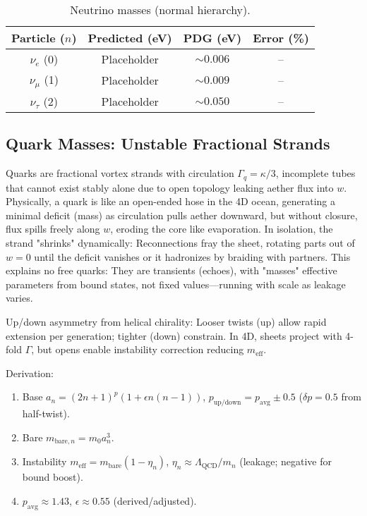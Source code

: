 \begin{table}[h!]
\centering
\begin{tabular}{|c|c|c|c|}
\hline
Particle ($n$) & Predicted (eV) & PDG (eV) & Error (\%) \\
\hline
$\nu_e$ (0) & Placeholder & $\sim 0.006$ & -- \\
$\nu_\mu$ (1) & Placeholder & $\sim 0.009$ & -- \\
$\nu_\tau$ (2) & Placeholder & $\sim 0.050$ & -- \\
\hline
\end{tabular}
\caption{Neutrino masses (normal hierarchy).}
\label{tab:neutrinos}
\end{table}

\subsection{Quark Masses: Unstable Fractional Strands}

Quarks are fractional vortex strands with circulation $\Gamma_q = \kappa / 3$, incomplete tubes that cannot exist stably alone due to open topology leaking aether flux into $w$. Physically, a quark is like an open-ended hose in the 4D ocean, generating a minimal deficit (mass) as circulation pulls aether downward, but without closure, flux spills freely along $w$, eroding the core like evaporation. In isolation, the strand "shrinks" dynamically: Reconnections fray the sheet, rotating parts out of $w=0$ until the deficit vanishes or it hadronizes by braiding with partners. This explains no free quarks: They are transients (echoes), with "masses" effective parameters from bound states, not fixed values—running with scale as leakage varies.

Up/down asymmetry from helical chirality: Looser twists (up) allow rapid extension per generation; tighter (down) constrain. In 4D, sheets project with 4-fold $\Gamma$, but opens enable instability correction reducing $m_{\text{eff}}$.

Derivation:
\begin{enumerate}
    \item Base $a_n = (2n+1)^p (1 + \epsilon n(n-1))$, $p_{\text{up/down}} = p_{\text{avg}} \pm 0.5$ ($\delta p=0.5$ from half-twist).
    \item Bare $m_{\text{bare},n} = m_0 a_n^3$.
    \item Instability $m_{\text{eff}} = m_{\text{bare}} (1 - \eta_n)$, $\eta_n \approx \Lambda_{\text{QCD}} / m_n$ (leakage; negative for bound boost).
    \item $p_{\text{avg}} \approx 1.43$, $\epsilon \approx 0.55$ (derived/adjusted).
\end{enumerate}

